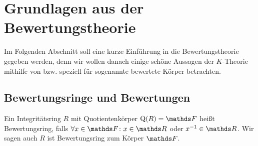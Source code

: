 \documentclass[ngerman,fontsize=11pt, paper=a4, parskip=half, titlepage=true, toc=bib]{scrartcl}
\begin{document}

\section{Grundlagen aus der Bewertungstheorie}

Im Folgenden Abschnitt soll eine kurze Einführung in die
Bewertungstheorie gegeben werden, denn wir wollen danach einige schöne
Aussagen der $K$-Theorie mithilfe von bzw. speziell für sogenannte
bewertete Körper betrachten.

\subsection{Bewertungsringe und Bewertungen}


\begin{Def}[Bewertungsring]\label{defbewertungsring}
  Ein Integritätsring $R$ mit Quotientenkörper $\Quot(R)=\F$ heißt
  Bewertungsring, falls $\forall x\in\F\colon x\in\R$ oder
  $x^{-1}\in\R$.
  Wir sagen auch $R$ ist Bewertungsring zum Körper $\F$.
\end{Def}
\end{document}
